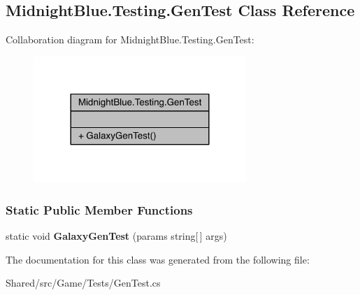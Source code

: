 \hypertarget{class_midnight_blue_1_1_testing_1_1_gen_test}{}\subsection{Midnight\+Blue.\+Testing.\+Gen\+Test Class Reference}
\label{class_midnight_blue_1_1_testing_1_1_gen_test}


Collaboration diagram for Midnight\+Blue.\+Testing.\+Gen\+Test\+:\nopagebreak
\begin{figure}[H]
\begin{center}
\leavevmode
\includegraphics[width=228pt]{class_midnight_blue_1_1_testing_1_1_gen_test__coll__graph}
\end{center}
\end{figure}
\subsubsection*{Static Public Member Functions}
\begin{DoxyCompactItemize}
\item 
\hypertarget{class_midnight_blue_1_1_testing_1_1_gen_test_a9e196f4e8e4336758ed2c2099ace6d58}{}\label{class_midnight_blue_1_1_testing_1_1_gen_test_a9e196f4e8e4336758ed2c2099ace6d58} 
static void {\bfseries Galaxy\+Gen\+Test} (params string\mbox{[}$\,$\mbox{]} args)
\end{DoxyCompactItemize}


The documentation for this class was generated from the following file\+:\begin{DoxyCompactItemize}
\item 
Shared/src/\+Game/\+Tests/Gen\+Test.\+cs\end{DoxyCompactItemize}

